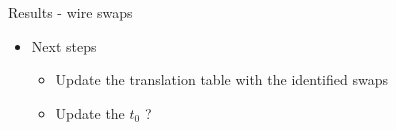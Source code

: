 \documentclass[10pt,aspectratio=43]{beamer}
\begin{document}
\begin{frame}{Results - wire swaps}
    \begin{itemize}
        \item Next steps
            \begin{itemize}
                \item Update the translation table with the identified swaps
                \item Update the $t_0$ ?
            \end{itemize}
    \end{itemize}

    \centering
    \vspace{0.2cm}

\end{frame}



    


\end{document}
